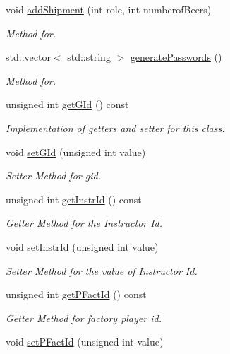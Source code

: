 \begin{DoxyCompactItemize}
void \hyperlink{classGame_a378029f01136b72969cba2cd716ff028}{add\+Shipment} (int role, int numberof\+Beers)
\begin{DoxyCompactList}\small\item\em Method for. \end{DoxyCompactList}\item 
std\+::vector$<$ std\+::string $>$ \hyperlink{classGame_abb451d6df42d5c439e4f3e16627732fd}{generate\+Passwords} ()
\begin{DoxyCompactList}\small\item\em Method for. \end{DoxyCompactList}\item 
unsigned int \hyperlink{classGame_aa4a7ec996cff81f9b7b6e90103ff2a1a}{get\+G\+Id} () const
\begin{DoxyCompactList}\small\item\em Implementation of getters and setter for this class. \end{DoxyCompactList}\item 
void \hyperlink{classGame_ab7b398c385cec5ea920d1b5053a1e707}{set\+G\+Id} (unsigned int value)
\begin{DoxyCompactList}\small\item\em Setter Method for gid. \end{DoxyCompactList}\item 
unsigned int \hyperlink{classGame_acbda63cea0b23cda6e11c4384bf4a869}{get\+Instr\+Id} () const
\begin{DoxyCompactList}\small\item\em Getter Method for the \hyperlink{classInstructor}{Instructor} Id. \end{DoxyCompactList}\item 
void \hyperlink{classGame_a6548484fe42f375e949b52c96a0bc348}{set\+Instr\+Id} (unsigned int value)
\begin{DoxyCompactList}\small\item\em Setter Method for the value of \hyperlink{classInstructor}{Instructor} Id. \end{DoxyCompactList}\item 
unsigned int \hyperlink{classGame_a9e03bc7bd2beb1b5077db5905dbc8146}{get\+P\+Fact\+Id} () const
\begin{DoxyCompactList}\small\item\em Getter Method for factory player id. \end{DoxyCompactList}\item 
void \hyperlink{classGame_a144ffe419003a0cb19001c46109a6bfe}{set\+P\+Fact\+Id} (unsigned int value)

\end{DoxyCompactItemize}

